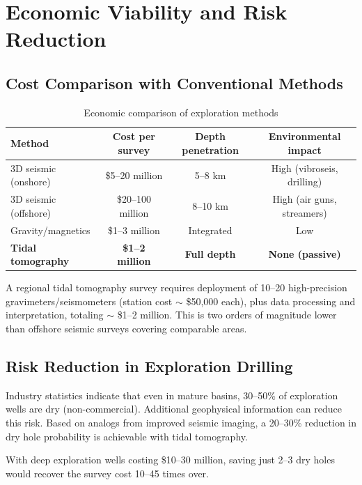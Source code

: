 \documentclass[12pt,a4paper]{article}
\theoremstyle{remark}
\begin{document}
	\section{Economic Viability and Risk Reduction}
	\label{sec:economics}
	
	\subsection{Cost Comparison with Conventional Methods}
	
	\begin{table}[htbp]
		\centering
		\caption{Economic comparison of exploration methods}
		\label{tab:economics}
		\small
		\begin{tabular}{lccc}
			\toprule
			\textbf{Method} & \textbf{Cost per survey} & \textbf{Depth penetration} & \textbf{Environmental impact} \\
			\midrule
			3D seismic (onshore) & \$5–20 million & 5–8 km & High (vibroseis, drilling) \\
			3D seismic (offshore) & \$20–100 million & 8–10 km & High (air guns, streamers) \\
			Gravity/magnetics & \$1–3 million & Integrated & Low \\
			\textbf{Tidal tomography} & \textbf{\$1–2 million} & \textbf{Full depth} & \textbf{None (passive)} \\
			\bottomrule
		\end{tabular}
	\end{table}
	
	A regional tidal tomography survey requires deployment of 10–20 high-precision gravimeters/seismometers (station cost $\sim$ \$50,000 each), plus data processing and interpretation, totaling $\sim$ \$1–2 million. This is two orders of magnitude lower than offshore seismic surveys covering comparable areas.
	
	\subsection{Risk Reduction in Exploration Drilling}
	
	Industry statistics indicate that even in mature basins, 30–50\% of exploration wells are dry (non-commercial). Additional geophysical information can reduce this risk. Based on analogs from improved seismic imaging, a 20–30\% reduction in dry hole probability is achievable with tidal tomography.
	
	With deep exploration wells costing \$10–30 million, saving just 2–3 dry holes would recover the survey cost 10–45 times over.
	
\end{document}

